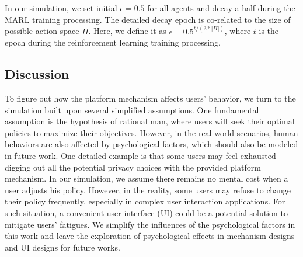 In our simulation, we set initial $\epsilon=0.5$ for all agents and decay a half during the MARL training processing. The detailed decay epoch is co-related to the size of possible action space $\Pi$.
Here, we define it as $\epsilon = 0.5^{ t /(3 * |\Pi |) }  $, 
where $t$ is the epoch during the reinforcement learning training processing. 

\subsection{\textbf{Discussion}}
To figure out how the platform mechanism affects users' behavior, we turn to the simulation built upon several simplified assumptions. 
One fundamental assumption is the hypothesis of rational man, where users will seek their optimal policies to maximize their objectives. 
However, in the real-world scenarios, human behaviors are also affected by psychological factors, which should also be modeled in future work.
One detailed example is that some users may feel exhausted digging out all the potential privacy choices with the provided platform mechanism.
In our simulation, we assume there remains no mental cost when a user adjusts his policy. 
However, in the reality, some users may refuse to change their policy frequently, especially in complex user interaction applications.
For such situation, a convenient user interface (UI) could be a potential solution to mitigate users' fatigues. 
We simplify the influences of the psychological factors in this work and leave the exploration of psychological effects in mechanism designs and UI designs for future works. 




